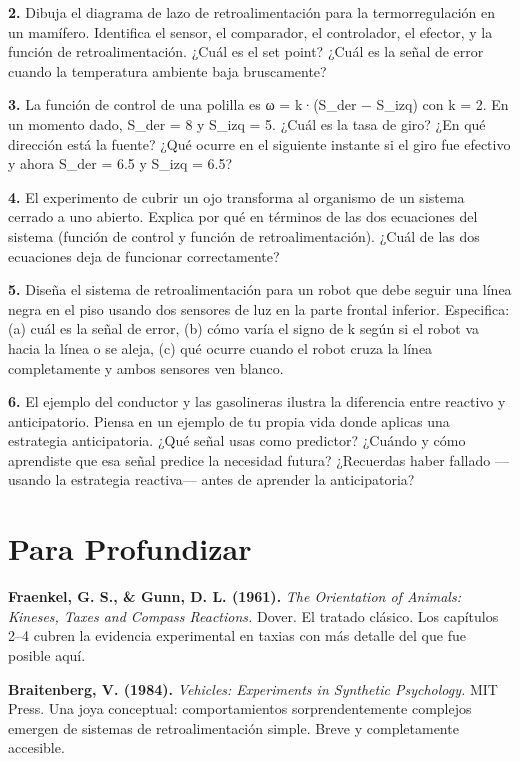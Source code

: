\documentclass[
  letterpaper,
  DIV=11,
  numbers=noendperiod]{scrreprt}
\begin{document}
\begin{tcolorbox}[enhanced jigsaw, toprule=.15mm, arc=.35mm, colback=white, opacityback=0, colframe=quarto-callout-note-color-frame, breakable, rightrule=.15mm, left=2mm, leftrule=.75mm, bottomrule=.15mm]
\textbf{2.} Dibuja el diagrama de lazo de retroalimentación para la
termorregulación en un mamífero. Identifica el sensor, el comparador, el
controlador, el efector, y la función de retroalimentación. ¿Cuál es el
set point? ¿Cuál es la señal de error cuando la temperatura ambiente
baja bruscamente?

\textbf{3.} La función de control de una polilla es ω = k·(S\_der −
S\_izq) con k = 2. En un momento dado, S\_der = 8 y S\_izq = 5. ¿Cuál es
la tasa de giro? ¿En qué dirección está la fuente? ¿Qué ocurre en el
siguiente instante si el giro fue efectivo y ahora S\_der = 6.5 y S\_izq
= 6.5?

\textbf{4.} El experimento de cubrir un ojo transforma al organismo de
un sistema cerrado a uno abierto. Explica por qué en términos de las dos
ecuaciones del sistema (función de control y función de
retroalimentación). ¿Cuál de las dos ecuaciones deja de funcionar
correctamente?

\textbf{5.} Diseña el sistema de retroalimentación para un robot que
debe seguir una línea negra en el piso usando dos sensores de luz en la
parte frontal inferior. Especifica: (a) cuál es la señal de error, (b)
cómo varía el signo de k según si el robot va hacia la línea o se aleja,
(c) qué ocurre cuando el robot cruza la línea completamente y ambos
sensores ven blanco.

\textbf{6.} El ejemplo del conductor y las gasolineras ilustra la
diferencia entre reactivo y anticipatorio. Piensa en un ejemplo de tu
propia vida donde aplicas una estrategia anticipatoria. ¿Qué señal usas
como predictor? ¿Cuándo y cómo aprendiste que esa señal predice la
necesidad futura? ¿Recuerdas haber fallado ---usando la estrategia
reactiva--- antes de aprender la anticipatoria?

\section{Para Profundizar}\label{para-profundizar}

\textbf{Fraenkel, G. S., \& Gunn, D. L. (1961).} \emph{The Orientation
of Animals: Kineses, Taxes and Compass Reactions.} Dover. El tratado
clásico. Los capítulos 2--4 cubren la evidencia experimental en taxias
con más detalle del que fue posible aquí.

\textbf{Braitenberg, V. (1984).} \emph{Vehicles: Experiments in
Synthetic Psychology.} MIT Press. Una joya conceptual: comportamientos
sorprendentemente complejos emergen de sistemas de retroalimentación
simple. Breve y completamente accesible.


\end{tcolorbox}
\end{document}
